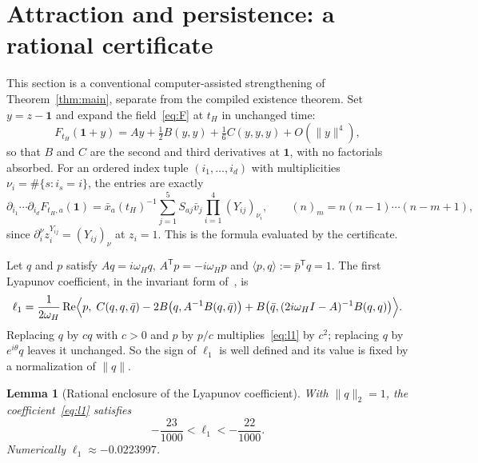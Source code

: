 \documentclass[11pt,a4paper]{article}
\theoremstyle{plain}
\newtheorem{lemma}[theorem]{Lemma}
\theoremstyle{definition}
\theoremstyle{remark}
\newcommand{\Real}{\operatorname{Re}}
\newcommand{\ones}{\mathbf{1}}
\newcommand{\xbar}{\bar x}
\newcommand{\vbar}{\bar v}
\begin{document}
\section{Attraction and persistence: a rational certificate}\label{sec:stability}

This section is a conventional computer-assisted strengthening of Theorem~\ref{thm:main}, separate from the compiled existence theorem. Set $y=z-\ones$ and expand the field~\eqref{eq:F} at $t_H$ in unchanged time:
\[
F_{t_H}(\ones+y)=Ay+\tfrac12B(y,y)+\tfrac16C(y,y,y)+O(\|y\|^4),
\]
so that $B$ and $C$ are the second and third derivatives at $\ones$, with no factorials absorbed. For an ordered index tuple $(i_1,\dots,i_d)$ with multiplicities $\nu_i=\#\{s:i_s=i\}$, the entries are exactly
\begin{equation}\label{eq:jets}
\partial_{i_1}\cdots\partial_{i_d}F_{t_H,a}(\ones)=\xbar_a(t_H)^{-1}\sum_{j=1}^5S_{aj}\vbar_j\prod_{i=1}^4(Y_{ij})_{\nu_i},
\qquad (n)_m=n(n-1)\cdots(n-m+1),
\end{equation}
since $\partial_i^{\nu}z_i^{Y_{ij}}=(Y_{ij})_\nu$ at $z_i=1$. This is the formula evaluated by the certificate.

Let $q$ and $p$ satisfy $Aq=i\omega_Hq$, $A^{\mathsf T}p=-i\omega_Hp$ and $\langle p,q\rangle:=\bar p^{\mathsf T}q=1$. The first Lyapunov coefficient, in the invariant form of~\cite[\S5.4]{Kuznetsov2004}, is
\begin{equation}\label{eq:l1}
\ell_1=\frac{1}{2\omega_H}\Real\Bigl\langle p,\;C(q,q,\bar q)-2B\bigl(q,A^{-1}B(q,\bar q)\bigr)+B\bigl(\bar q,(2i\omega_HI-A)^{-1}B(q,q)\bigr)\Bigr\rangle .
\end{equation}
Replacing $q$ by $cq$ with $c>0$ and $p$ by $p/c$ multiplies~\eqref{eq:l1} by $c^2$; replacing $q$ by $e^{i\theta}q$ leaves it unchanged. So the sign of $\ell_1$ is well defined and its value is fixed by a normalization of $\|q\|$.

\begin{lemma}[Rational enclosure of the Lyapunov coefficient]\label{lem:interval}
With $\|q\|_2=1$, the coefficient~\eqref{eq:l1} satisfies
\[
-\frac{23}{1000}<\ell_1<-\frac{22}{1000}.
\]
Numerically $\ell_1\approx-0.0223997$.
\end{lemma}
\end{document}
